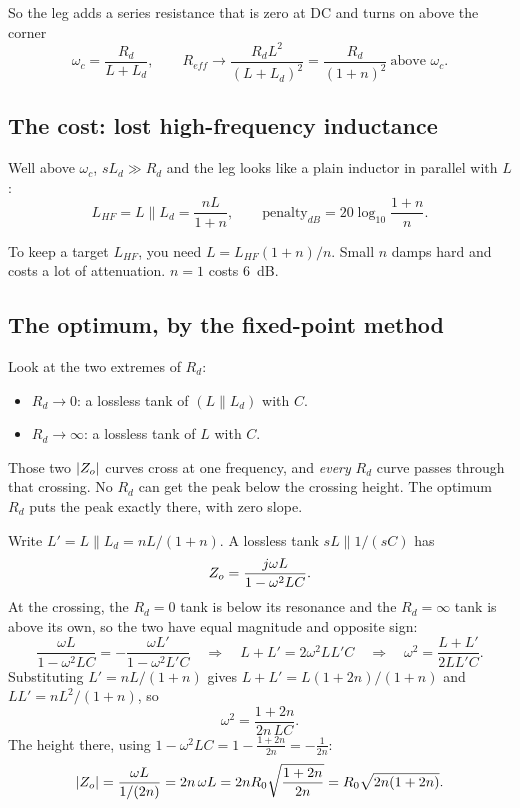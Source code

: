 So the leg adds a series resistance that is zero at DC and turns on above the corner
\[
	\omega_c = \frac{R_d}{L + L_d}, \qquad
	R_{eff} \to \frac{R_d L^2}{(L + L_d)^2} = \frac{R_d}{(1+n)^2}\ \text{above } \omega_c.
\]

\subsection{The cost: lost high-frequency inductance}

Well above $\omega_c$, $sL_d \gg R_d$ and the leg looks like a plain inductor in
parallel with $L$:
\begin{equation}\label{eq:lhf}
	L_{HF} = L \parallel L_d = \frac{nL}{1+n}, \qquad
	\text{penalty}_{dB} = 20\log_{10}\frac{1+n}{n}.
\end{equation}

To keep a target $L_{HF}$, you need $L = L_{HF}(1+n)/n$. Small $n$ damps hard
and costs a lot of attenuation. $n = 1$ costs 6~dB.

\subsection{The optimum, by the fixed-point method}

\begin{idea}
	Look at the two extremes of $R_d$:
	\begin{itemize}
		\item $R_d \to 0$: a lossless tank of $(L \parallel L_d)$ with $C$.
		\item $R_d \to \infty$: a lossless tank of $L$ with $C$.
	\end{itemize}
	Those two $\lvert Z_o\rvert$ curves cross at one frequency, and \emph{every}
	$R_d$ curve passes through that crossing. No $R_d$ can get the peak below
	the crossing height. The optimum $R_d$ puts the peak exactly there, with zero slope.
\end{idea}

\begin{derivation}
	Write $L' = L \parallel L_d = nL/(1+n)$. A lossless tank $sL \parallel 1/(sC)$ has
	\[
		Z_o = \frac{j\omega L}{1 - \omega^2 LC}.
	\]
	At the crossing, the $R_d = 0$ tank is below its resonance and the
	$R_d = \infty$ tank is above its own, so the two have equal magnitude and
	opposite sign:
	\[
		\frac{\omega L}{1 - \omega^2 LC} = -\frac{\omega L'}{1 - \omega^2 L'C}
		\quad\Rightarrow\quad
		L + L' = 2\omega^2 L L' C
		\quad\Rightarrow\quad
		\omega^2 = \frac{L + L'}{2LL'C}.
	\]
	Substituting $L' = nL/(1+n)$ gives $L + L' = L(1+2n)/(1+n)$ and
	$LL' = nL^2/(1+n)$, so
	\[
		\omega^2 = \frac{1 + 2n}{2n\,LC}.
	\]
	The height there, using $1 - \omega^2 LC = 1 - \frac{1+2n}{2n} = -\frac{1}{2n}$:
	\[
		\lvert Z_o\rvert = \frac{\omega L}{1/(2n)} = 2n\,\omega L
		= 2n R_0 \sqrt{\frac{1+2n}{2n}}
		= R_0\sqrt{2n(1+2n)}.
	\]
\end{derivation}

